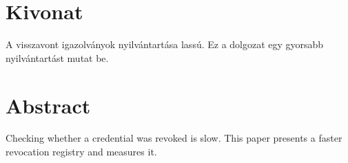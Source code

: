 \setcounter{page}{1}

\selecthungarian

\chapter*{Kivonat}

A visszavont igazolványok nyilvántartása lassú. Ez a dolgozat egy gyorsabb nyilvántartást mutat be.

\vfill
\selectenglish

\chapter*{Abstract}

Checking whether a credential was revoked is slow. This paper presents a faster revocation registry and measures it.

\vfill
\selectthesislanguage
